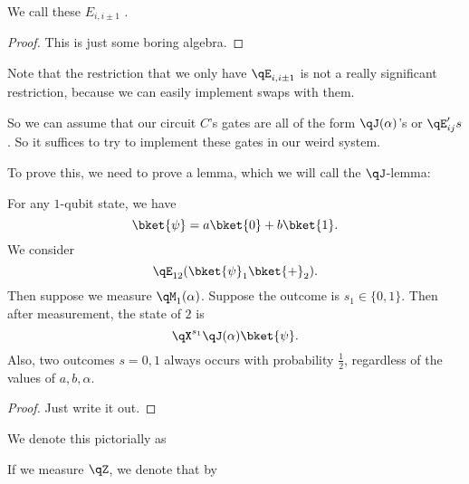 \documentclass[a4paper]{article}
\begin{document}
We call these $E_{i, i \pm 1}$ .
\begin{proof}
  This is just some boring algebra.
\end{proof}

Note that the restriction that we only have $\qE_{i, i\pm 1}$ is not a really significant restriction, because we can easily implement swaps with them.

So we can assume that our circuit $C$'s gates are all of the form $\qJ(\alpha)$'s or $\qE_{ij}'s$. So it suffices to try to implement these gates in our weird system.

To prove this, we need to prove a lemma, which we will call the $\qJ$-lemma:
\begin{lemma}[$\qJ$-lemma]
  For any $1$-qubit state, we have
  \[
    \bket{\psi} = a\bket{0} + b \bket{1}.
  \]
  We consider
  \[
    \qE_{12} (\bket{\psi}_1 \bket{+}_2).
  \]
  Then suppose we measure $\qM_1(\alpha)$. Suppose the outcome is $s_1 \in \{0, 1\}$. Then after measurement, the state of $2$ is
  \[
    \qX^{s_1} \qJ(\alpha) \bket{\psi}.
  \]
  Also, two outcomes $s = 0, 1$ always occurs with probability $\frac{1}{2}$, regardless of the values of $a, b, \alpha$.
\end{lemma}

\begin{proof}
  Just write it out.
\end{proof}

We denote this pictorially as
\begin{center}
\end{center}
If we measure $\qZ$, we denote that by
\begin{center}
\end{center}
\end{document}
